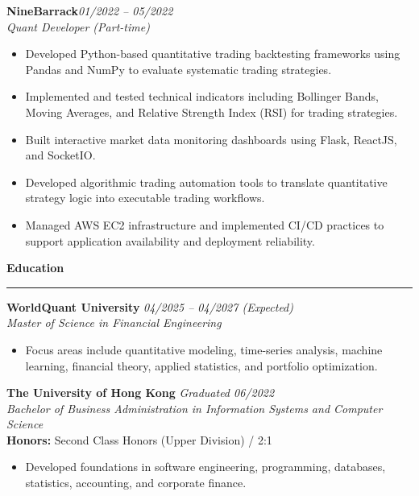 \documentclass[10pt,a4paper]{article}
\newcommand{\resumesection}[1]{%
    \vspace{1.4ex}
    {\large\bfseries #1}\par
    \vspace{0.4ex}
    \hrule
    \vspace{0.7ex}
}
\newcommand{\experience}[3]{%
    \Needspace{5\baselineskip}
    \textbf{#1}\hfill\textit{#3}\\
    \textit{#2}\par
}
\begin{document}
\vspace{0.8ex}

\experience
{NineBarrack}
{Quant Developer (Part-time)}
{01/2022 -- 05/2022}

\begin{itemize}
    \item Developed Python-based quantitative trading
    backtesting frameworks using Pandas and NumPy
    to evaluate systematic trading strategies.

    \item Implemented and tested technical indicators
    including Bollinger Bands, Moving Averages,
    and Relative Strength Index (RSI) for trading strategies.

    \item Built interactive market data monitoring
    dashboards using Flask, ReactJS, and SocketIO.

    \item Developed algorithmic trading automation tools
    to translate quantitative strategy logic into
    executable trading workflows.

    \item Managed AWS EC2 infrastructure and implemented
    CI/CD practices to support application availability
    and deployment reliability.
\end{itemize}

\resumesection{Education}

\textbf{WorldQuant University}
\hfill \textit{04/2025 -- 04/2027 (Expected)}\\
\textit{Master of Science in Financial Engineering}

\begin{itemize}
    \item Focus areas include quantitative modeling,
    time-series analysis, machine learning, financial theory,
    applied statistics, and portfolio optimization.
\end{itemize}

\vspace{0.8ex}

\textbf{The University of Hong Kong}
\hfill \textit{Graduated 06/2022}\\
\textit{Bachelor of Business Administration in Information
Systems and Computer Science}\\
\textbf{Honors:} Second Class Honors (Upper Division) / 2:1

\begin{itemize}
    \item Developed foundations in software engineering,
    programming, databases, statistics, accounting,
    and corporate finance.
\end{itemize}
\end{document}
